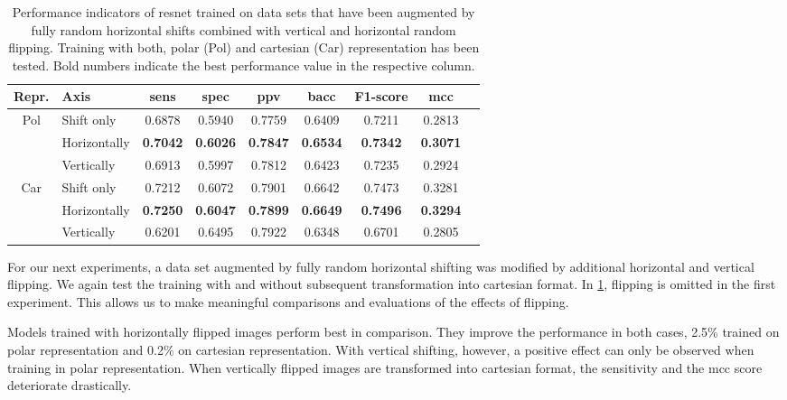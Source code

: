 \begin{table}[H]
    \centering
    \begin{tabular}{|c|l|c|c|c|c|c|c|c|}
        \hline
        Repr. & Axis & \acrshort{sens} & \acrshort{spec} & \acrshort{ppv} & \acrshort{bacc} & F1-score & \acrshort{mcc} \\\hline\hline
        \multirow{3}{2em}{Pol} & Shift only & 0.6878 & 0.5940 & 0.7759 & 0.6409 & 0.7211 & 0.2813\\
         & Horizontally & \textbf{0.7042} & \textbf{0.6026} & \textbf{0.7847} & \textbf{0.6534} & \textbf{0.7342} & \textbf{0.3071} \\
         & Vertically & 0.6913 & 0.5997 & 0.7812 & 0.6423 & 0.7235 & 0.2924 \\
        \hline
        \multirow{3}{2em}{Car} & Shift only & 0.7212 & 0.6072 & 0.7901 & 0.6642 & 0.7473 & 0.3281 \\
         & Horizontally & \textbf{0.7250} & \textbf{0.6047} & \textbf{0.7899} & \textbf{0.6649} & \textbf{0.7496} & \textbf{0.3294} \\
         & Vertically & 0.6201 & 0.6495 & 0.7922 & 0.6348 & 0.6701 & 0.2805 \\
        \hline
    \end{tabular}
    \caption[Random flipping]{Performance indicators of \acrshort{resnet} trained on data sets that have been augmented by fully random horizontal shifts combined with vertical and horizontal random flipping. Training with both, polar (Pol) and cartesian (Car) representation has been tested. Bold numbers indicate the best performance value in the respective column.}
    \label{tab:da_flipping}
\end{table}
For our next experiments, a data set augmented by fully random horizontal shifting was modified by additional horizontal and vertical flipping. We again test the training with and without subsequent transformation into cartesian format. In \cref{tab:da_flipping}, flipping is omitted in the first experiment. This allows us to make meaningful comparisons and evaluations of the effects of flipping.

Models trained with horizontally flipped images perform best in comparison. They improve the performance in both cases, 2.5\% trained on polar representation and 0.2\% on cartesian representation. With vertical shifting, however, a positive effect can only be observed when training in polar representation. When vertically flipped images are transformed into cartesian format, the sensitivity and the \acrshort{mcc} score deteriorate drastically.

